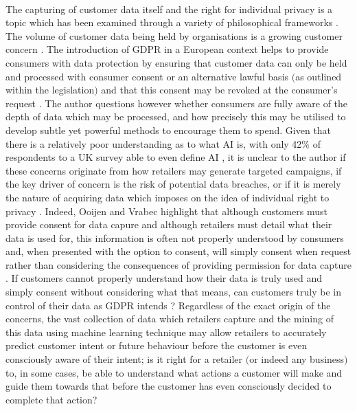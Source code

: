 \documentclass[11pt]{article}
\theoremstyle{plain}
\theoremstyle{definition}
\begin{document}
\\
The capturing of customer data itself and the right for individual privacy is a topic which has been examined through a variety of philosophical frameworks \cite{10.2307/25123662}. The volume of customer data being held by organisations is a growing customer concern \cite{Gimpel:2018aa}. The introduction of GDPR in a European context helps to provide consumers with data protection by ensuring that customer data can only be held and processed with consumer consent or an alternative lawful basis $($as outlined within the legislation$)$ and that this consent may be revoked at the consumer's request \cite{ITGP-Privacy-Team:2017aa}. The author questions however whether consumers are fully aware of the depth of data which may be processed, and how precisely this may be utilised to develop subtle yet powerful methods to encourage them to spend. Given that there is a relatively poor understanding as to what AI is, with only 42\% of respondents to a UK survey able to even define AI \cite{10.1145/3306618.3314232}, it is unclear to the author if these concerns originate from how retailers may generate targeted campaigns, if the key driver of concern is the risk of potential data breaches, or if it is merely the nature of acquiring data which imposes on the idea of individual right to privacy \cite{:2015aa}. Indeed, Ooijen and Vrabec highlight that although customers must provide consent for data capure and although retailers must detail what their data is used for, this information is often not properly understood by consumers and, when presented with the option to consent, will simply consent when request rather than considering the consequences of providing permission for data capture \cite{Ooijen:2019aa} . If customers cannot properly understand how their data is truly used and simply consent without considering what that means, can customers truly be in control of their data as GDPR intends \cite{ITGP-Privacy-Team:2017aa}? Regardless of the exact origin of the concerns, the vast collection of data which retailers capture and the mining of this data using machine learning technique may allow retailers to accurately predict customer intent or future behaviour before the customer is even consciously aware of their intent; is it right for a retailer $($or indeed any business$)$ to, in some cases, be able to understand what actions a customer will make and guide them towards that before the customer has even consciously decided to complete that action?\\ 
\\
\end{document}
